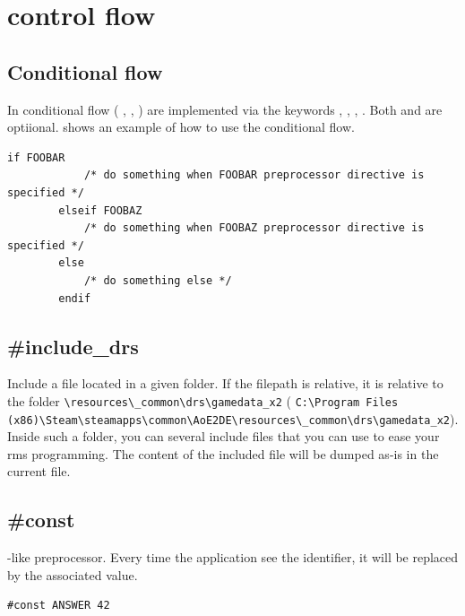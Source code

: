     

    \section{ control flow}

    \subsection{Conditional flow}

    In  conditional flow (\ie{} , , ) are implemented via the keywords , , , . Both  and  are optiional.
     shows an example of how to use the conditional flow.

    \begin{lstlisting}[language={rms}, label={lst:if}]
        if FOOBAR
            /* do something when FOOBAR preprocessor directive is specified */
        elseif FOOBAZ
            /* do something when FOOBAZ preprocessor directive is specified */
        else
            /* do something else */
        endif
    \end{lstlisting}

    \subsection{\#include\_drs}

    Include a file located in a given folder. If the filepath is relative, it is relative to the folder \aoeexedir{}\verb|\resources\_common\drs\gamedata_x2| (\eg{} \verb|C:\Program Files (x86)\Steam\steamapps\common\AoE2DE\resources\_common\drs\gamedata_x2|). Inside such a folder, you can several include files that you can use to ease your rms programming. The content of the included file will be dumped as-is in the current file.

    \subsection{\#const}

    -like preprocessor. Every time the application see the identifier, it will be replaced by the associated value.

    \begin{lstlisting}[language={rms}, label={lst:const}]
        #const ANSWER 42
    \end{lstlisting}

